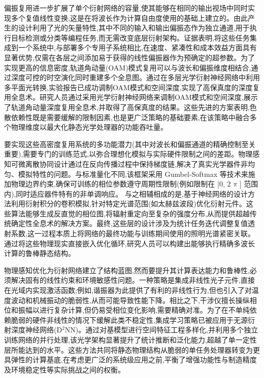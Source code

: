 偏振复用进一步扩展了单个衍射网络的容量,使其能够在相同的输出视场中同时实现多个复值线性变换,这是在将波长作为计算自由度使用的基础上建立的。由此产生的设计利用了光的矢量特性,其中不同的输入和输出偏振态作为独立通道,用于执行目标检测或分类等编程任务,而无需改变底层衍射架构。证据表明,将这些任务集成到一个系统中,与部署多个专用子系统相比,在速度、紧凑性和成本效益方面具有显著优势,仅需在各层之间添加易于获得的线性偏振器作为预确定的超参数。为了实现更高的信息密度,轨道角动量(OAM)模式复用可以与波长和偏振维度相结合,通过深度可控的时空演化同时重建多个全息图。通过在多层光学衍射神经网络中利用多平面光转换,实验报告已成功调制OAM模式和空间深度,实现了高保真度的深度复用全息术。研究人员通过采用光学衍射神经网络来调制OAM模式和空间深度,展示了轨道角动量深度复用全息术,并取得了高保真度的结果。\citep{doi_10_1364_oe_447337_61ffab71}这些先进的方案表明,色散依赖性既是需要缓解的限制因素,也是更广泛策略的基础要素,在该策略中融合多个物理维度以最大化静态光学处理器的功能吞吐量。\citep{doi_10_1038_s41377_022_00849_x_e31226af} \citep{doi_10_1364_oe_447337_61ffab71}

要实现这些高密度复用系统的多功能潜力(其中对波长和偏振通道的精确控制至关重要),需要专门的训练范式,以弥合理想化模拟与实际硬件限制之间的差距。物理感知可微离散协同设计通过在反向传播过程中保持梯度链,解决了真实光学器件非均匀、模拟特性的问题。与标准量化不同,该框架采用 Gumbel-Softmax 等技术来施加物理边界约束,确保可训练的相位参数遵守周期性限制(例如限制在 {[}0, 2 \(\pi\) {]} 范围内),同时适应器件特有的非单调响应。\citep{doi_10_1145_3508352_3549378_13c53996} 与之相辅相成的是,基于神经网络的设计方法利用衍射积分的卷积模拟,针对特定光谱范围(如太赫兹波段)优化衍射元件。这些算法能够生成反直觉的相位图,将辐射重定向至复杂的强度分布,从而提供超越传统确定性全息术的解决方案。最终,这些层的设计涉及为统计任务迭代调整复值透射系数,这一过程本质上将网络的最终功能与训练期间使用的照明光谱紧密关联。通过将这些物理现实直接嵌入优化循环,研究人员可以构建出能够执行精确多波长计算的鲁棒静态结构。\citep{doi_10_1145_3508352_3549378_13c53996} \citep{doi_10_1109_tthz_2023_3344020_a0a550ba} \citep{doi_10_1021_acsphotonics_0c01583_7c90196c}

物理感知优化为衍射网络建立了结构蓝图,然而要提升其计算表达能力和鲁棒性,必须解决固有的线性约束和环境敏感性问题。一种策略是集成非线性光子元件,直接在光域内实现激活函数;例如,谐振器为此提供了有利的非线性行为,但也引入了对温度波动和机械振动的脆弱性,从而可能导致性能下降。相比之下,干涉仪擅长操纵相位和振幅以进行复杂计算,但仍易受相位变化影响,需要精确对准。为了在不单纯依赖脆弱的硬件非线性的情况下缓解此类不稳定性,集成学习策略已被应用于无源衍射深度神经网络(D\(^{2}\)NN)。通过对基模型进行空间特征工程多样化,并利用多个独立训练网络的并行处理,该光学架构显著提升了统计推断和泛化能力,超越了单一定性层所能达到的水平。这些方法共同将静态物理结构从脆弱的单任务处理器转变为更具弹性的计算基底,在考虑更广泛的系统级应用之前,平衡了增强功能性与制造精度及环境稳定性等实际挑战之间的权衡。\citep{doi_10_3390_nano14080697_c372a140} \citep{doi_10_1038_s41377_020_00446_w_c890b40c}

